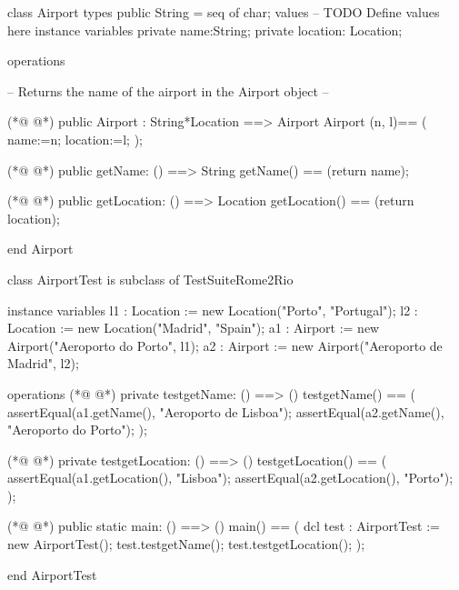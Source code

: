 \begin{vdmpp}[breaklines=true]
class Airport 
types
public String = seq of char;
values
-- TODO Define values here
instance variables
private name:String;
private location: Location;

operations

-- Returns the name of the airport in the Airport object --

(*@
\label{Airport:14}
@*)
public Airport : String*Location ==> Airport
Airport (n, l)== (
 name:=n;
 location:=l;
 );
 
(*@
\label{getName:20}
@*)
public getName: () ==> String
getName() == (return name);

(*@
\label{getLocation:23}
@*)
public getLocation: () ==> Location
getLocation() == (return location);
    
end Airport

class AirportTest is subclass of TestSuiteRome2Rio

 instance variables
 l1 :  Location := new Location("Porto", "Portugal");
 l2 : Location := new Location("Madrid", "Spain");
 a1 : Airport := new Airport("Aeroporto do Porto", l1);
 a2 : Airport := new Airport("Aeroporto de Madrid", l2);
 
 operations
(*@
\label{testgetName:37}
@*)
  private testgetName: () ==> ()
   testgetName() == (
    assertEqual(a1.getName(), "Aeroporto de Lisboa");
    assertEqual(a2.getName(), "Aeroporto do Porto");
   );
   
(*@
\label{testgetLocation:43}
@*)
   private testgetLocation: () ==> ()
   testgetLocation() == (
    assertEqual(a1.getLocation(), "Lisboa");
    assertEqual(a2.getLocation(), "Porto");
   );
   
   
(*@
\label{main:50}
@*)
 public static main: () ==> ()
      main() ==
      (
       dcl test : AirportTest := new AirportTest();
       test.testgetName();
       test.testgetLocation();
       );
       
end AirportTest
\end{vdmpp}
